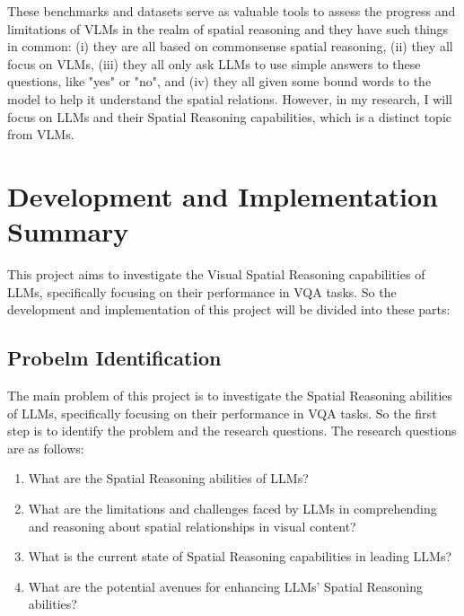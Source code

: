 \documentclass[journal,10pt]{IEEEtran}
\begin{document}
These benchmarks and datasets serve as valuable tools to assess the progress and limitations of VLMs in the realm of spatial reasoning and they have such things in common: (i) they are all based on commonsense spatial reasoning, (ii) they all focus on VLMs, (iii) they all only ask LLMs to use simple answers to these questions, like "yes" or "no", and (iv) they all given some bound words to the model to help it understand the spatial relations. However, in my research, I will focus on LLMs and their Spatial Reasoning capabilities, which is a distinct topic from VLMs. 


\section{Development and Implementation Summary}
This project aims to investigate the Visual Spatial Reasoning capabilities of LLMs, specifically focusing on their performance in VQA tasks. So the development and implementation of this project will be divided into these parts:

\subsection{Probelm Identification}
The main problem of this project is to investigate the Spatial Reasoning abilities of LLMs, specifically focusing on their performance in VQA tasks. So the first step is to identify the problem and the research questions. The research questions are as follows:
\begin{enumerate}
    \item What are the Spatial Reasoning abilities of LLMs?
    \item What are the limitations and challenges faced by LLMs in comprehending and reasoning about spatial relationships in visual content?
    \item What is the current state of Spatial Reasoning capabilities in leading LLMs?
    \item What are the potential avenues for enhancing LLMs' Spatial Reasoning abilities?
\end{enumerate}
\end{document}

